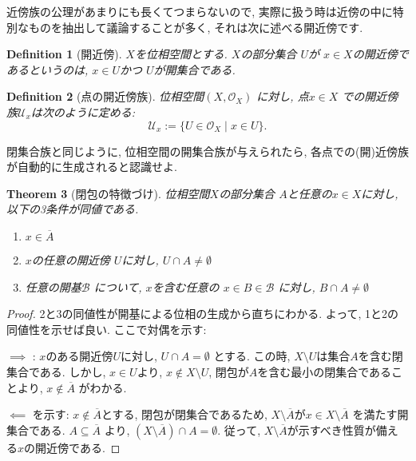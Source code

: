 \documentclass[lualatex]{ltjsbook}
\newcommand{\cl}[1]{\overline{ #1}  }
\newtheorem{theorem}{Theorem}[chapter]
\newtheorem{definition}[theorem]{Definition}
\theoremstyle{remark}
\theoremstyle{plain}
\begin{document}
近傍族の公理があまりにも長くてつまらないので,  実際に扱う時は近傍の中に特別なものを抽出して議論することが多く,  それは次に述べる開近傍です.





\begin{definition}[開近傍]
	$X$を位相空間とする. $X$の部分集合 $U$が $x \in X$の開近傍であるというのは,   $ x \in U$かつ $U$が開集合である.
\end{definition}

\begin{definition}[点の開近傍族]
	位相空間$\left( X,  \mathcal{O}_X \right) $ に対し,  点$x \in X$ での開近傍族$\mathcal{U}_x$は次のように定める:
	\[
	\mathcal{U}_x := \{U \in \mathcal{O}_X \mid x \in U\} 
	.\] 
\end{definition}


閉集合族と同じように,  位相空間の開集合族が与えられたら,  各点での(開)近傍族が自動的に生成されると認識せよ.

\begin{theorem}[閉包の特徴づけ]
	位相空間$X$の部分集合 $A$と任意の$x \in X$に対し,  以下の3条件が同値である.
	 \begin{enumerate}
		\item $x \in \cl{A}$
		\item  $x$の任意の開近傍 $U$に対し,   $U\cap A \neq \emptyset$
		\item  任意の開基$\mathcal{B}$ について,  $x$を含む任意の $ x \in B \in \mathcal{B}$ に対し,  $B\cap A \neq \emptyset$
	\end{enumerate}
\end{theorem}


\begin{proof}
	2と3の同値性が開基による位相の生成から直ちにわかる. よって,  1と2の同値性を示せば良い.
ここで対偶を示す:

$\implies$ : $x$のある開近傍$U$に対し,   $U \cap A = \emptyset$ とする. 
この時,   $X \setminus U$は集合$A$を含む閉集合である. 
しかし,   $x \in U $より,  $x \not\in X \setminus U$,  閉包が$A$を含む最小の閉集合であることより,  $x \not\in \cl{A}$ がわかる.

$\impliedby$ を示す: $x \not\in \cl{A} $とする,  閉包が閉集合であるため,  $X \setminus \cl{A}$が$x \in X \setminus \cl{A}$ を満たす開集合である. 
$A \subseteq \cl{A}$ より,  $\left( X\setminus \cl{A} \right) \cap A = \emptyset$. 
従って,  $X \setminus \cl{A}$が示すべき性質が備える$x$の開近傍である.
	
\end{proof}
\end{document}
